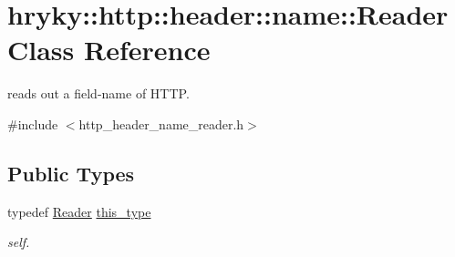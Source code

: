 \hypertarget{classhryky_1_1http_1_1header_1_1name_1_1_reader}{\section{hryky\-:\-:http\-:\-:header\-:\-:name\-:\-:Reader Class Reference}
\label{classhryky_1_1http_1_1header_1_1name_1_1_reader}
}


reads out a field-\/name of H\-T\-T\-P.  




{\ttfamily \#include $<$http\-\_\-header\-\_\-name\-\_\-reader.\-h$>$}

\subsection*{Public Types}
\begin{DoxyCompactItemize}
\item 
\hypertarget{classhryky_1_1http_1_1header_1_1name_1_1_reader_ace8bca464723d7ca1460bd39c59fe2e6}{typedef \hyperlink{classhryky_1_1http_1_1header_1_1name_1_1_reader}{Reader} \hyperlink{classhryky_1_1http_1_1header_1_1name_1_1_reader_ace8bca464723d7ca1460bd39c59fe2e6}{this\-\_\-type}}\label{classhryky_1_1http_1_1header_1_1name_1_1_reader_ace8bca464723d7ca1460bd39c59fe2e6}

\begin{DoxyCompactList}\small\item\em self. \end{DoxyCompactList}\end{DoxyCompactItemize}
